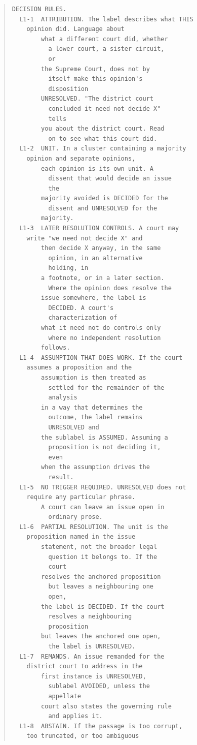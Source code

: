 \begin{quote}
\begin{verbatim}
DECISION RULES.
  L1-1  ATTRIBUTION. The label describes what THIS
    opinion did. Language about
        what a different court did, whether
          a lower court, a sister circuit,
          or
        the Supreme Court, does not by
          itself make this opinion's
          disposition
        UNRESOLVED. "The district court
          concluded it need not decide X"
          tells
        you about the district court. Read
          on to see what this court did.
  L1-2  UNIT. In a cluster containing a majority
    opinion and separate opinions,
        each opinion is its own unit. A
          dissent that would decide an issue
          the
        majority avoided is DECIDED for the
          dissent and UNRESOLVED for the
        majority.
  L1-3  LATER RESOLUTION CONTROLS. A court may
    write "we need not decide X" and
        then decide X anyway, in the same
          opinion, in an alternative
          holding, in
        a footnote, or in a later section.
          Where the opinion does resolve the
        issue somewhere, the label is
          DECIDED. A court's
          characterization of
        what it need not do controls only
          where no independent resolution
        follows.
  L1-4  ASSUMPTION THAT DOES WORK. If the court
    assumes a proposition and the
        assumption is then treated as
          settled for the remainder of the
          analysis
        in a way that determines the
          outcome, the label remains
          UNRESOLVED and
        the sublabel is ASSUMED. Assuming a
          proposition is not deciding it,
          even
        when the assumption drives the
          result.
  L1-5  NO TRIGGER REQUIRED. UNRESOLVED does not
    require any particular phrase.
        A court can leave an issue open in
          ordinary prose.
  L1-6  PARTIAL RESOLUTION. The unit is the
    proposition named in the issue
        statement, not the broader legal
          question it belongs to. If the
          court
        resolves the anchored proposition
          but leaves a neighbouring one
          open,
        the label is DECIDED. If the court
          resolves a neighbouring
          proposition
        but leaves the anchored one open,
          the label is UNRESOLVED.
  L1-7  REMANDS. An issue remanded for the
    district court to address in the
        first instance is UNRESOLVED,
          sublabel AVOIDED, unless the
          appellate
        court also states the governing rule
          and applies it.
  L1-8  ABSTAIN. If the passage is too corrupt,
    too truncated, or too ambiguous

\end{verbatim}
\end{quote}

